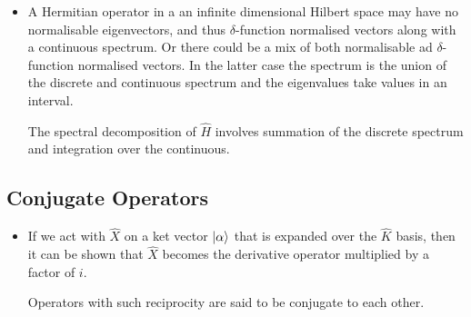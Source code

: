 \documentclass[11pt]{article}
\numberwithin{equation}{section}
\begin{document}
\begin{itemize}
\item A Hermitian operator in a an infinite dimensional Hilbert space may have no normalisable eigenvectors, and thus $\delta$-function normalised vectors along with a continuous spectrum. Or there could be a mix of both normalisable ad $\delta$-function normalised vectors. In the latter case the spectrum is the union of the discrete and continuous spectrum and the eigenvalues take values in an interval. 

The spectral decomposition of $\hat{H}$ involves summation of the discrete spectrum and integration over the continuous. 


\end{itemize}

\subsection{Conjugate Operators}
\begin{itemize}
    \item If we act with $\hat{X}$ on a ket vector $\ket{\alpha}$ that is expanded over the $\hat{K}$ basis, then it can be shown that $\hat{X}$ becomes the derivative operator multiplied by a factor of $i$. 

Operators with such reciprocity are said to be conjugate to each other. 
\end{itemize}
\end{document}
